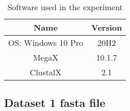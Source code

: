 \begin{table}[H]
    \caption{Software used in the experiment}
    \centering
    \begin{tabular}{cc}
        \toprule
        Name&Version\\
        \midrule
        OS: Windows 10 Pro&20H2\\
        MegaX&10.1.7\\
        ClustalX&2.1\\
        \bottomrule
    \end{tabular}
\end{table}

\subsection{Dataset 1 fasta file}
\lstset{basicstyle=\tiny\ttfamily}

